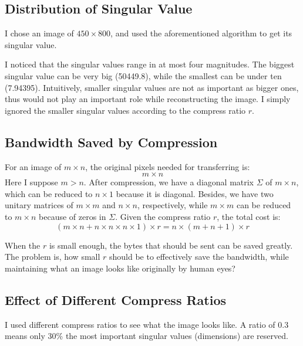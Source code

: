 \documentclass{article}
\begin{document}
        \subsection{Distribution of Singular Value}
            \par
            I chose an image of $450 \times 800$,
            and used the aforementioned algorithm to get its singular value.
            \par
            I noticed that the singular values range in at most four magnitudes.
            The biggest singular value can be very big (50449.8),
            while the smallest can be under ten (7.94395).
            Intuitively, smaller singular values are not as important as bigger ones,
            thus would not play an important role while reconstructing the image.
            I simply ignored the smaller singular values according to the compress ratio $r$.

        \subsection{Bandwidth Saved by Compression}
            \par
            For an image of $m \times n$,
            the original pixels needed for transferring is: $$m \times n$$
            Here I suppose $m > n$.
            After compression, we have a diagonal matrix $\Sigma$ of $m \times n$,
            which can be reduced to $n \times 1$ because it is diagonal.
            Besides, we have two unitary matrices of $m \times m$ and $n \times n$, respectively,
            while $m \times m$ can be reduced to $m \times n$ because of zeros in $\Sigma$.
            Given the compress ratio $r$,
            the total cost is:
            $$(m \times n + n \times n \times n \times 1) \times r = n \times (m + n + 1) \times r$$
            \par
            When the $r$ is small enough, the bytes that should be sent can be saved greatly.
            The problem is, how small $r$ should be to effectively save the bandwidth,
            while maintaining what an image looks like originally by human eyes?

        \subsection{Effect of Different Compress Ratios}
            \par
            I used different compress ratios to see what the image looks like.
            A ratio of 0.3 means only 30\%
            the most important singular values (dimensions) are reserved.
\end{document}
